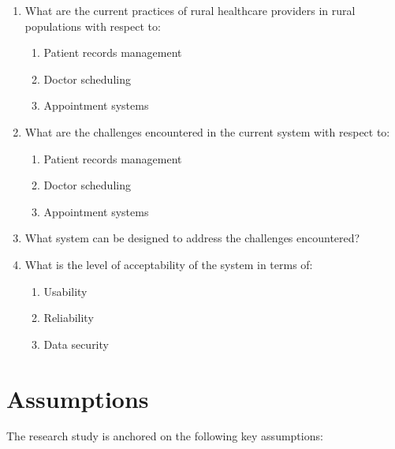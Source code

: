 \documentclass[12pt]{report}
\begin{document}
\begin{enumerate}[label=\arabic*., leftmargin=0.75in, itemsep=4pt, parsep=0pt]
  \item What are the current practices of rural healthcare providers in rural
        populations with respect to:
        \begin{enumerate}[label=\alph*), leftmargin=0.5in, itemsep=2pt]
          \item Patient records management
          \item Doctor scheduling
          \item Appointment systems
        \end{enumerate}
  \item What are the challenges encountered in the current system with respect to:
        \begin{enumerate}[label=\alph*), leftmargin=0.5in, itemsep=2pt]
          \item Patient records management
          \item Doctor scheduling
          \item Appointment systems
        \end{enumerate}
  \item What system can be designed to address the challenges encountered?
  \item What is the level of acceptability of the system in terms of:
        \begin{enumerate}[label=\alph*), leftmargin=0.5in, itemsep=2pt]
          \item Usability
          \item Reliability
          \item Data security
        \end{enumerate}
\end{enumerate}

\section*{Assumptions}

The research study is anchored on the following key assumptions:
\end{document}

